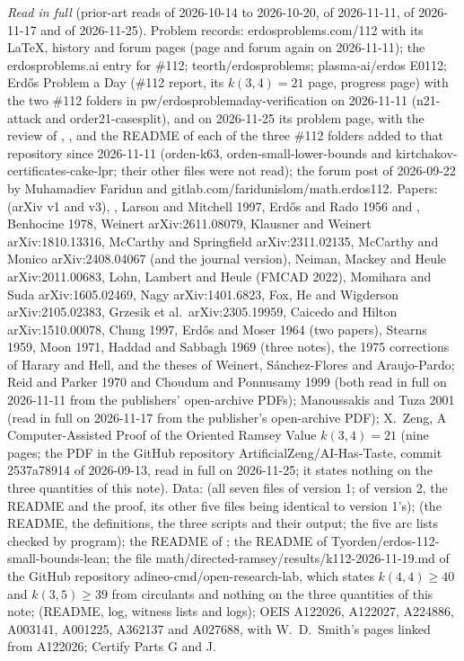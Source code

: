 \documentclass[11pt]{amsart}
\theoremstyle{plain}
\theoremstyle{definition}
\theoremstyle{remark}
\begin{document}
\medskip
\noindent\emph{Read in full} (prior-art reads of 2026-10-14 to 2026-10-20, of 2026-11-11, of
2026-11-17 and of 2026-11-25). Problem records: erdosproblems.com/112 with its LaTeX, history and
forum pages (page and forum again on 2026-11-11); the erdosproblems.ai entry for \#112;
teorth/erdosproblems; plasma-ai/erdos E0112; Erd\H{o}s Problem a Day (\#112 report, its
$k(3,4)=21$ page, progress page) with the two \#112 folders in pw/erdosproblemaday-verification
on 2026-11-11 (n21-attack and order21-casesplit), and on 2026-11-25 its problem page,
\cite{EPAD} with the review of \cite{Orden2}, \cite{EPAD2}, and the README of each of the three
\#112 folders added to that repository since 2026-11-11 (orden-k63, orden-small-lower-bounds and
kirtchakov-certificates-cake-lpr; their other files were not read); the forum post of 2026-09-22 by
Muhamadiev Faridun and gitlab.com/faridunislom/math.erdos112. Papers: \cite{IRW21} (arXiv v1 and
v3), \cite{Ber74}, Larson and Mitchell 1997, Erd\H{o}s and Rado 1956 and \cite{ErRa67}, Benhocine
1978, Weinert arXiv:2611.08079, Klausner and Weinert arXiv:1810.13316, McCarthy and Springfield
arXiv:2311.02135, McCarthy and Monico arXiv:2408.04067 (and the journal version), Neiman, Mackey and
Heule arXiv:2011.00683, Lohn, Lambert and Heule (FMCAD 2022), Momihara and Suda arXiv:1605.02469,
Nagy arXiv:1401.6823, Fox, He and Wigderson arXiv:2105.02383, Grzesik et al.\ arXiv:2305.19959,
Caicedo and Hilton arXiv:1510.00078, Chung 1997, Erd\H{o}s and Moser 1964 (two papers), Stearns 1959,
Moon 1971, Haddad and Sabbagh 1969 (three notes), the 1975 corrections of Harary and Hell, and the
theses of Weinert, S\'anchez-Flores and Araujo-Pardo; Reid and Parker 1970 and Choudum and
Ponnusamy 1999 (both read in full on 2026-11-11 from the publishers' open-archive PDFs);
Manoussakis and Tuza 2001 (read in full on 2026-11-17 from the publisher's open-archive PDF);
X.~Zeng, A Computer-Assisted Proof of the Oriented Ramsey Value $k(3,4)=21$ (nine pages; the PDF in
the GitHub repository ArtificialZeng/AI-Has-Taste, commit 2537a78914 of 2026-09-13, read in full on
2026-11-25; it states nothing on the three quantities of this note). Data: \cite{Orden} (all seven
files of version 1; of version 2, the README and the proof, its other five files being identical to
version 1's); \cite{Orden2} (the README, the definitions, the three scripts and their output; the
five arc lists checked by program); the README of \cite{OrdenLean}; the README of
Tyorden/erdos-112-small-bounds-lean; the file math/directed-ramsey/results/k112-2026-11-19.md of
the GitHub repository adineo-cmd/open-research-lab, which states $k(4,4)\geq 40$ and
$k(3,5)\geq 39$ from circulants and nothing on the three quantities of this note; \cite{rsv}
(README, log, witness lists and logs); OEIS A122026, A122027, A224886, A003141, A001225, A362137
and A027688, with W.~D.~Smith's pages linked from A122026; Certify Parts G and J.
\end{document}
